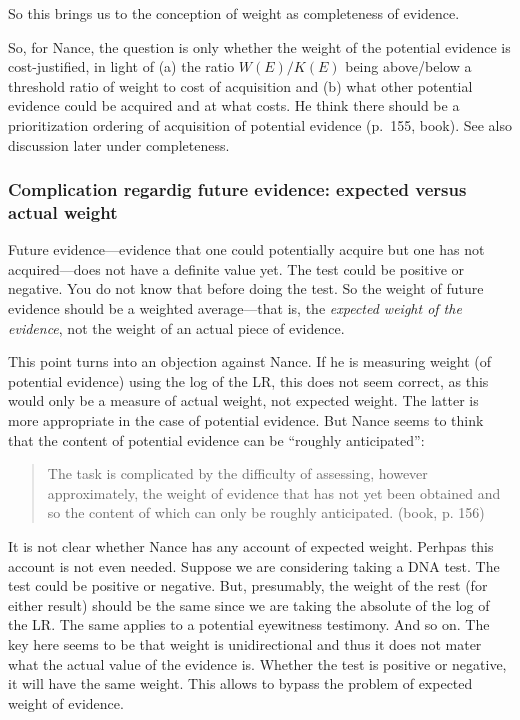 \documentclass[
  10pt,
  dvipsnames,enabledeprecatedfontcommands]{scrartcl}
\begin{document}

So this brings us to the conception of weight as completeness of
evidence.

So, for Nance, the question is only whether the weight of the potential
evidence is cost-justified, in light of (a) the ratio \(W(E)/K(E)\)
being above/below a threshold ratio of weight to cost of acquisition and
(b) what other potential evidence could be acquired and at what costs.
He think there should be a prioritization ordering of acquisition of
potential evidence (p.~155, book). See also discussion later under
completeness.

\hypertarget{complication-regardig-future-evidence-expected-versus-actual-weight}{%
\subsubsection{Complication regardig future evidence: expected versus
actual
weight}\label{complication-regardig-future-evidence-expected-versus-actual-weight}}

Future evidence---evidence that one could potentially acquire but one
has not acquired---does not have a definite value yet. The test could be
positive or negative. You do not know that before doing the test. So the
weight of future evidence should be a weighted average---that is, the
\textit{expected weight of the evidence}, not the weight of an actual
piece of evidence.

This point turns into an objection against Nance. If he is measuring
weight (of potential evidence) using the log of the LR, this does not
seem correct, as this would only be a measure of actual weight, not
expected weight. The latter is more appropriate in the case of potential
evidence. But Nance seems to think that the content of potential
evidence can be ``roughly anticipated'':

\begin{quote}
The task is complicated by the difficulty of assessing, however approximately, the weight of evidence that has not yet been obtained and so the content of which can only be roughly anticipated. (book, p. 156)
\end{quote}

It is not clear whether Nance has any account of expected weight.
Perhpas this account is not even needed. Suppose we are considering
taking a DNA test. The test could be positive or negative. But,
presumably, the weight of the rest (for either result) should be the
same since we are taking the absolute of the log of the LR. The same
applies to a potential eyewitness testimony. And so on. The key here
seems to be that weight is unidirectional and thus it does not mater
what the actual value of the evidence is. Whether the test is positive
or negative, it will have the same weight. This allows to bypass the
problem of expected weight of evidence.
\end{document}
